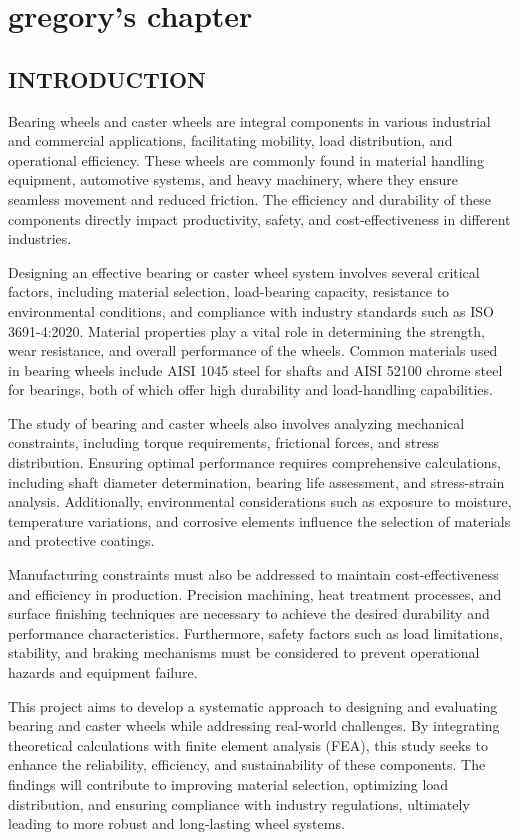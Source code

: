 \documentclass[../../main]{subfiles}
\begin{document}
\chapter{gregory's chapter}

\section{INTRODUCTION}

Bearing wheels and caster wheels are integral components in various
industrial and commercial applications, facilitating mobility, load
distribution, and operational efficiency. These wheels are commonly
found in material handling equipment, automotive systems, and heavy
machinery, where they ensure seamless movement and reduced friction. The
efficiency and durability of these components directly impact
productivity, safety, and cost-effectiveness in different industries.

Designing an effective bearing or caster wheel system involves several
critical factors, including material selection, load-bearing capacity,
resistance to environmental conditions, and compliance with industry
standards such as ISO 3691-4:2020. Material properties play a vital role
in determining the strength, wear resistance, and overall performance of
the wheels. Common materials used in bearing wheels include AISI 1045
steel for shafts and AISI 52100 chrome steel for bearings, both of which
offer high durability and load-handling capabilities.

The study of bearing and caster wheels also involves analyzing
mechanical constraints, including torque requirements, frictional
forces, and stress distribution. Ensuring optimal performance requires
comprehensive calculations, including shaft diameter determination,
bearing life assessment, and stress-strain analysis. Additionally,
environmental considerations such as exposure to moisture, temperature
variations, and corrosive elements influence the selection of materials
and protective coatings.

Manufacturing constraints must also be addressed to maintain
cost-effectiveness and efficiency in production. Precision machining,
heat treatment processes, and surface finishing techniques are necessary
to achieve the desired durability and performance characteristics.
Furthermore, safety factors such as load limitations, stability, and
braking mechanisms must be considered to prevent operational hazards and
equipment failure.

This project aims to develop a systematic approach to designing and
evaluating bearing and caster wheels while addressing real-world
challenges. By integrating theoretical calculations with finite element
analysis (FEA), this study seeks to enhance the reliability, efficiency,
and sustainability of these components. The findings will contribute to
improving material selection, optimizing load distribution, and ensuring
compliance with industry regulations, ultimately leading to more robust
and long-lasting wheel systems.
\end{document}
